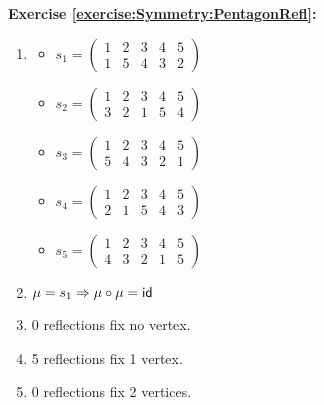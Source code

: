 \noindent\textbf{Exercise \ref{exercise:Symmetry:PentagonRefl}:}
\begin{enumerate}[{a.}]
\item
	\begin{multicols}{2}
	\begin{itemize}
	\item
	$s_1 =\begin{pmatrix}
	1 & 2 & 3 & 4 & 5\\
	1 & 5 & 4 & 3 & 2
	\end{pmatrix}$
	
	\item
	$s_2 =\begin{pmatrix}
	1 & 2 & 3 & 4 & 5\\
	3 & 2 & 1 & 5 & 4
	\end{pmatrix}$
	
	\item
	$s_3 =\begin{pmatrix}
	1 & 2 & 3 & 4 & 5\\
	5 & 4 & 3 & 2 & 1
	\end{pmatrix}$
	
	\item
	$s_4 =\begin{pmatrix}
	1 & 2 & 3 & 4 & 5\\
	2 & 1 & 5 & 4 & 3
	\end{pmatrix}$
	
	\item
	$s_5 =\begin{pmatrix}
	1 & 2 & 3 & 4 & 5\\
	4 & 3 & 2 & 1 & 5
	\end{pmatrix}$
	\end{itemize}
	\end{multicols}
	
\item
$\mu = s_1 \Rightarrow \mu \circ \mu = \sf{id}$

\item
0 reflections fix no vertex.

\item
5 reflections fix 1 vertex.

\item
0 reflections fix 2 vertices.
\end{enumerate}

